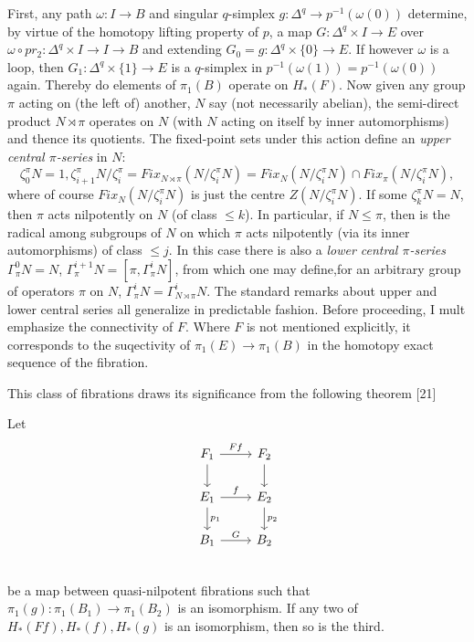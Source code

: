 First, any path $\omega \colon   I\longrightarrow B$ and singular $q$-simplex $g \colon   \Delta^q\longrightarrow p^{-1} (\omega(0))$ determine, by virtue of the homotopy lifting property of $p$, a map $G \colon   \Delta^q \times I\longrightarrow E$ over $\omega \circ pr_2 \colon    \Delta^q \times I \longrightarrow I \longrightarrow  B$ and extending $G_0 = g \colon   \Delta^q \times \{0\} \longrightarrow E$. If however $\omega$ is a loop, then $G_1 \colon  \Delta^q \times \{1\} \longrightarrow E$ is a $q$-simplex in $p^{-1}(\omega(1)) = p^{-1}(\omega(0))$ again. Thereby do elements of $\pi_1(B)$ operate on $H_*(F)$. Now given any group $\pi$ acting on (the left of) another, $N$ say (not necessarily abelian), the semi-direct product $N\rtimes \pi$ operates on $N$ (with $N$ acting on itself by inner automorphisms) and thence its quotients. The fixed-point sets under this action define an {\em upper central $\pi$-series} in $N$:
\[\zeta_0^\pi N=1, \zeta_{i+1}^\pi N/\zeta_i^\pi= Fix_{N\rtimes \pi}(N/\zeta_i^\pi N)=Fix_N(N/\zeta_i^\pi N)\cap Fix_\pi(N/\zeta_i^\pi N),\]
where of course $Fix_N(N/\zeta_i^\pi N)$ is just the centre $Z(N/\zeta_i^\pi N)$. If some $\zeta_k^\pi N = N$\label{page37}, then $\pi$ acts nilpotently on $N$ (of class $\leqslant k$). In particular, if $N \leqslant \pi$, then is the radical among
subgroups of $N$ on which $\pi$ acts nilpotently (via its inner automorphisms) of class $\leqslant j$. In this case there is also a {\em lower central $\pi$-series} $\Gamma_\pi^0 N = N$, $\Gamma_\pi^{i+1}N = [\pi,\Gamma_\pi^i N] $, from which one may define,for an arbitrary group of operators $\pi$ on $N$, $\Gamma_\pi^i N = \Gamma^i_{N\rtimes \pi}N$. The standard remarks about upper and lower central series all generalize in predictable fashion. Before proceeding, I mult emphasize the connectivity of $F$. Where $F$ is not mentioned explicitly, it corresponds to the suqectivity of $\pi_1(E) \longrightarrow \pi_1(B)$ in the homotopy exact sequence of the fibration.

This class of fibrations draws its significance from the following theorem [21]
\begin{prop}
   Let
\[\begin{tikzcd}
F_{1} \arrow{r}{Ff} \arrow{d}       & F_2 \arrow{d}\\
E_1   \arrow{r}{f}  \arrow{d}{p_1}  & E_2 \arrow{d}{p_2}\\
B_1   \arrow{r}{G}                  & B_2\\
\end{tikzcd}\]
be a map between quasi-nilpotent fibrations such that $\pi_1 (g) \colon   \pi_1(B_1) \longrightarrow \pi_1(B_2)$ is an isomorphism. If any two of $H_*(Ff),H_*(f), H_*(g)$ is an isomorphism, then so is the third.
\end{prop}

